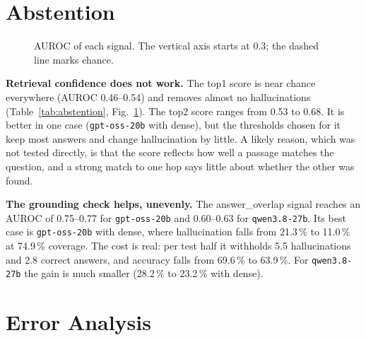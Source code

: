 \section{Abstention}\label{sec:res-abstention}

\begin{table}[htbp]
\centering\footnotesize
\caption{Abstention on held-out answers, as the mean over 200 random development/test splits (about 49 answers per test
half). AUROC is computed on all answers of the model. Cover.: coverage. Hall., Acc.: hallucination rate and accuracy,
before and after abstention; SD over the overlapping splits in brackets, which is not a confidence interval. Rem.:
hallucinations withheld per test half. Lost: correct answers withheld per test half. The ``before'' values are averaged
over test halves, so they differ slightly from Table~\ref{tab:main}.}\label{tab:abstention}
\resizebox{\textwidth}{!}{}
\end{table}

\begin{figure}[htbp]
\centering
{}
\caption{AUROC of each signal. The vertical axis starts at 0.3; the dashed line marks chance.}\label{fig:auroc}
\end{figure}

\textbf{Retrieval confidence does not work.} The top1 score is near chance everywhere (AUROC 0.46--0.54) and removes
almost no hallucinations (Table~\ref{tab:abstention}, Fig.~\ref{fig:auroc}). The top2 score ranges from 0.53 to 0.68. It
is better in one case (\texttt{gpt-oss-20b} with dense), but the thresholds chosen for it keep most answers and change
hallucination by little. A likely reason, which was not tested directly, is that the score reflects how well a passage
matches the question, and a strong match to one hop says little about whether the other was found.

\textbf{The grounding check helps, unevenly.} The answer\_overlap signal reaches an AUROC of 0.75--0.77 for
\texttt{gpt-oss-20b} and 0.60--0.63 for \texttt{qwen3.8-27b}. Its best case is \texttt{gpt-oss-20b} with dense, where
hallucination falls from 21.3\,\% to 11.0\,\% at 74.9\,\% coverage. The cost is real: per test half it withholds 5.5
hallucinations and 2.8 correct answers, and accuracy falls from 69.6\,\% to 63.9\,\%. For \texttt{qwen3.8-27b} the gain is
much smaller (28.2\,\% to 23.2\,\% with dense).

\section{Error Analysis}\label{sec:res-errors}


